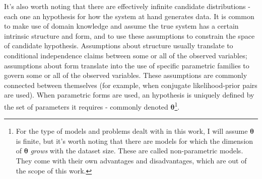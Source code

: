 It's also worth noting that there are effectively infinite candidate distributions -
each one an hypothesis for how the system at hand generates data. It is common
to make use of domain knowledge and assume the true system has a certain intrinsic
structure and form, and to use these assumptions to constrain the space of
candidate hypothesis. Assumptions about structure usually translate to conditional
independence claims between some or all of the observed variables; assumptions
about form translate into the use of specific parametric families to govern some
or all of the observed variables. These assumptions are commonly connected between
themselves (for example, when conjugate likelihood-prior pairs are used). When parametric
forms are used, an hypothesis is uniquely defined by the set of parameters it
requires - commonly denoted $\bm{\theta}$\footnote{For the type of models and problems
dealt with in this work, I will assume $\bm{\theta}$ is finite, but it's worth
noting that there are models for which the dimension of $\bm{\theta}$ \emph{grows}
with the dataset size. These are called non-parametric models. They come with
their own advantages and disadvantages, which are out of the scope of this work.}.

